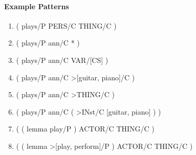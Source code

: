 \documentclass[11pt, numbers=noenddot]{scrreprt}
\begin{document}
\paragraph{Example Patterns}
\begin{enumerate}[label={$p_{\arabic*}$ = }]
	\item \textsf{( plays/P PERS/C THING/C )}
	\item \textsf{( plays/P ann/C * )} 
	\item \textsf{( plays/P ann/C VAR/[CS] )}
	\item \textsf{( plays/P ann/C >[guitar, piano]/C )}
	\item \textsf{( plays/P ann/C >THING/C )}
	\item \textsf{( plays/P ann/C ( >IN\gls{st}/C [guitar, piano] ) )}
	\item \textsf{( ( lemma play/P ) ACTOR/C THING/C )}
	\item \textsf{( ( lemma >[play, perform]/P ) ACTOR/C THING/C )}
\end{enumerate}

\end{document}
